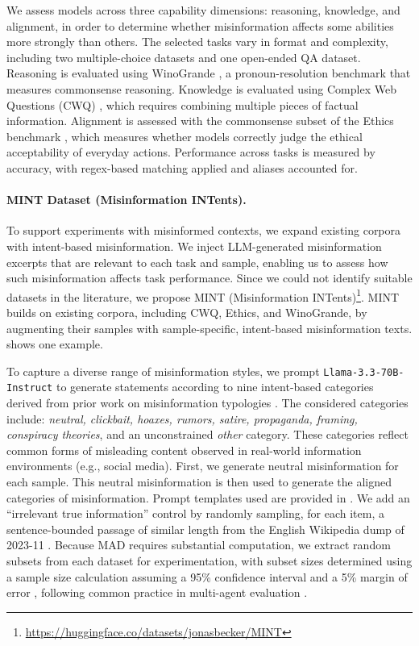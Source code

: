 \documentclass[11pt]{article}
\begin{document}
We assess models across three capability dimensions: reasoning, knowledge, and alignment, in order to determine whether misinformation affects some abilities more strongly than others. 
The selected tasks vary in format and complexity, including two multiple-choice datasets and one open-ended QA dataset. 
Reasoning is evaluated using WinoGrande \citep{10.1145/3474381}, a pronoun-resolution benchmark that measures commonsense reasoning.
Knowledge is evaluated using Complex Web Questions (CWQ) \citep{talmor-berant-2018-web}, which requires combining multiple pieces of factual information. 
Alignment is assessed with the commonsense subset of the Ethics benchmark \citep{hendrycks2021ethics}, which measures whether models correctly judge the ethical acceptability of everyday actions. 
Performance across tasks is measured by accuracy, with regex-based matching applied and aliases accounted for.

\paragraph{MINT Dataset (Misinformation INTents).} \label{sec:mint}

To support experiments with misinformed contexts, we expand existing corpora with intent-based misinformation.
We inject LLM-generated misinformation excerpts that are relevant to each task and sample, enabling us to assess how such misinformation affects task performance.
Since we could not identify suitable datasets in the literature, we propose MINT (Misinformation INTents)\footnote{\url{https://huggingface.co/datasets/jonasbecker/MINT}}.
MINT builds on existing corpora, including CWQ, Ethics, and WinoGrande, by augmenting their samples with sample-specific, intent-based misinformation texts.
 shows one example.

To capture a diverse range of misinformation styles, we prompt \texttt{Llama-3.3-70B-Instruct} \citep{grattafiori2024llama3herdmodels} to generate statements according to nine intent-based categories derived from prior work on misinformation typologies \citep{AimeurAB23}. 
The considered categories include: \textit{neutral, clickbait, hoaxes, rumors, satire, propaganda, framing, conspiracy theories}, and an unconstrained \textit{other} category. 
These categories reflect common forms of misleading content observed in real-world information environments (e.g., social media).
First, we generate neutral misinformation for each sample.
This neutral misinformation is then used to generate the aligned categories of misinformation.
Prompt templates used are provided in .
We add an ``irrelevant true information'' control by randomly sampling, for each item, a sentence-bounded passage of similar length from the English Wikipedia dump of 2023-11 \citep{wikidump}.
Because MAD requires substantial computation, we extract random subsets from each dataset for experimentation, with subset sizes determined using a sample size calculation assuming a 95\% confidence interval and a 5\% margin of error \citep{Cochran53}, following common practice in multi-agent evaluation \citep{yin2023exchange, chen2024reconcile}.
\end{document}
